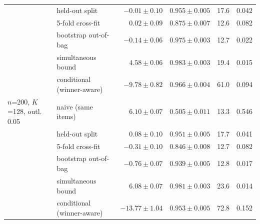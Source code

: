 {\begin{tabular}{llrrrr}
 & held-out split & $-0.01 \pm 0.10$ & $0.955 \pm 0.005$ & 17.6 & 0.042 \\
 & 5-fold cross-fit & $0.02 \pm 0.09$ & $0.875 \pm 0.007$ & 12.6 & 0.082 \\
 & bootstrap out-of-bag & $-0.14 \pm 0.06$ & $0.975 \pm 0.003$ & 12.7 & 0.022 \\
 & simultaneous bound & $4.58 \pm 0.06$ & $0.983 \pm 0.003$ & 19.4 & 0.015 \\
 & conditional (winner-aware) & $-9.78 \pm 0.82$ & $0.966 \pm 0.004$ & 61.0 & 0.094 \\
\midrule
$n$=200, $K$=128, outl. 0.05 & naive (same items) & $6.10 \pm 0.07$ & $0.505 \pm 0.011$ & 13.3 & 0.546 \\
 & held-out split & $0.08 \pm 0.10$ & $0.951 \pm 0.005$ & 17.7 & 0.041 \\
 & 5-fold cross-fit & $-0.31 \pm 0.10$ & $0.846 \pm 0.008$ & 12.7 & 0.082 \\
 & bootstrap out-of-bag & $-0.76 \pm 0.07$ & $0.939 \pm 0.005$ & 12.8 & 0.017 \\
 & simultaneous bound & $6.08 \pm 0.07$ & $0.981 \pm 0.003$ & 23.6 & 0.014 \\
 & conditional (winner-aware) & $-13.77 \pm 1.04$ & $0.953 \pm 0.005$ & 72.8 & 0.152 \\
\bottomrule
\end{tabular}}
